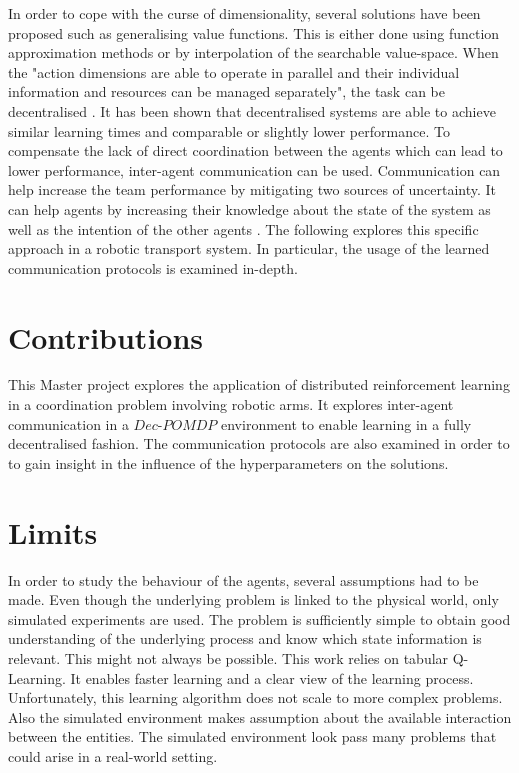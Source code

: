 In order to cope with the curse of dimensionality, several solutions have been proposed such as generalising value functions. This is either done using function approximation methods or by interpolation of the searchable value-space. When the "action dimensions are able to operate in parallel and their individual information and resources can be managed separately", the task can be decentralised \cite{l._leottau_decentralized_2017}. It has been shown that decentralised systems are able to achieve similar learning times and comparable or slightly lower performance. To compensate the lack of direct coordination between the agents which can lead to lower performance, inter-agent communication can be used. Communication can help increase the team performance by mitigating two sources of uncertainty. It can help agents by increasing their knowledge about the state of the system as well as the intention of the other agents \cite{t._j._spaan_decentralized_2006}. The following explores this specific approach in a robotic transport system. In particular, the usage of the learned communication protocols is examined in-depth. 

\section{Contributions}

This Master project explores the application of distributed reinforcement learning in a coordination problem involving robotic arms. It explores inter-agent communication in a $Dec$-$POMDP$ environment to enable learning in a fully decentralised fashion. The communication protocols are also examined in order to to gain insight in the influence of the hyperparameters on the solutions. 

\section{Limits}

In order to study the behaviour of the agents, several assumptions had to be made. Even though the underlying problem is linked to the physical world, only simulated experiments are used. The problem is sufficiently simple to obtain good understanding of the underlying process and know which state information is relevant. This might not always be possible. This work relies on tabular Q-Learning. It enables faster learning and a clear view of the learning process. Unfortunately, this learning algorithm does not scale to more complex problems. Also the simulated environment makes assumption about the available interaction between the entities. The simulated environment look pass many problems that could arise in a real-world setting.

